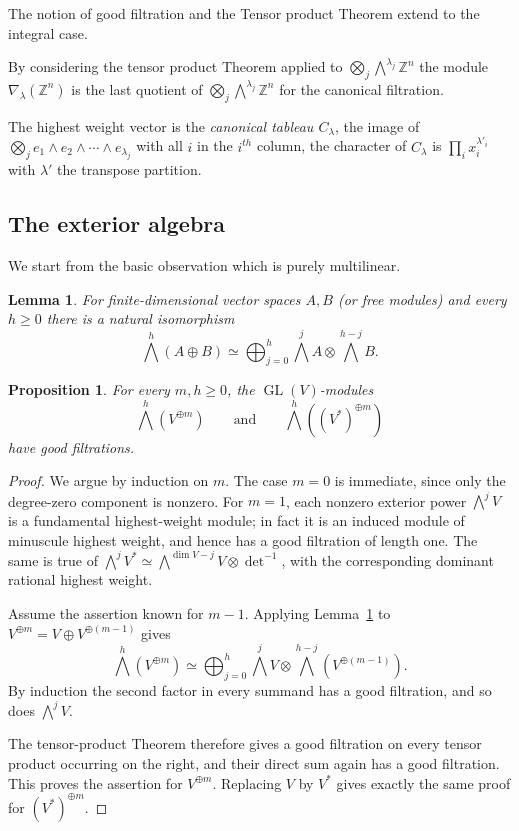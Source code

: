 \documentclass[10pt]{amsart}
\newtheorem{proposition}[theorem]{Proposition}
\newtheorem{lemma}[theorem]{Lemma}
\theoremstyle{definition}
\theoremstyle{remark}
\newcommand{\Z}{\mathbb Z}
\newcommand{\GL}{\operatorname{GL}}
\begin{document}
 \smallskip


The notion of good filtration and the Tensor product Theorem extend to the integral case.  

By considering  
  the tensor product Theorem applied to $\bigotimes_j\bigwedge^{\lambda_j}\Z^n$ 
the module  $\nabla_\lambda(\Z^n)$ is the  last quotient of  $\bigotimes_j\bigwedge^{\lambda_j}\Z^n$ for the canonical filtration. \smallskip

The highest weight vector is the {\em canonical tableau $C_\lambda$}, the image of  $\bigotimes_je_1\wedge e_2 \wedge\cdots \wedge e_{\lambda_j}$ with all $i$ in the $i^{th}$ column, the character of $C_\lambda$ is $\prod_ix_i^{\lambda'_i}$ with $\lambda'$ the transpose partition.\smallskip



 


 \subsection{The exterior algebra}

  
We start from the basic observation which is purely multilinear.

\begin{lemma}\label{lem:exterior-direct-sum}
For finite-dimensional vector spaces $A,B$ (or free modules) and every $h\ge0$ there is a
natural isomorphism
\[
\bigwedge^h(A\oplus B)
\simeq
\bigoplus_{j=0}^h
\bigwedge^j A\otimes \bigwedge^{h-j}B.
\]
\end{lemma}

\begin{proposition}\label{prop:wedge-copies-good}
For every $m,h\ge0$, the $\GL(V)$-modules
\[
\bigwedge^h(V^{\oplus m})
\qquad\text{and}\qquad
\bigwedge^h((V^*)^{\oplus m})
\]
have good filtrations.
\end{proposition}

\begin{proof}
We argue by induction on $m$. The case $m=0$ is immediate, since only the degree-zero component is nonzero. For $m=1$, each nonzero exterior power
$\bigwedge^jV$ is a fundamental highest-weight module; in fact it is an
induced module of minuscule highest weight, and hence has a good filtration
of length one. The same is true of $\bigwedge^jV^*\simeq \bigwedge^{\dim V-j}V\otimes \det^{-1}$, with the corresponding
dominant rational highest weight.\smallskip

Assume the assertion known for $m-1$. Applying
Lemma~\ref{lem:exterior-direct-sum} to
$V^{\oplus m}=V\oplus V^{\oplus(m-1)}$ gives
\[
\bigwedge^h(V^{\oplus m})
\simeq
\bigoplus_{j=0}^h
\bigwedge^jV\otimes
\bigwedge^{h-j}(V^{\oplus(m-1)}).
\]
By induction the second factor in every summand has a good filtration, and
so does $\bigwedge^jV$. \smallskip

The tensor-product Theorem therefore gives a good
filtration on every tensor product occurring on the right, and their direct
sum again has a good filtration. This proves the assertion for $V^{\oplus
m}$. Replacing $V$ by $V^*$ gives exactly the same proof for
$(V^*)^{\oplus m}$.
\end{proof}
\end{document}
